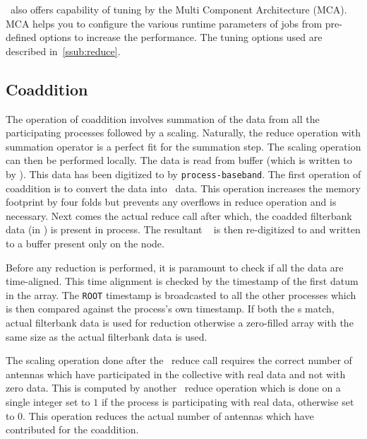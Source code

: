 \par \mpi~also offers capability of tuning by the Multi Component Architecture (MCA). MCA helps you to configure the various runtime parameters of \mpi jobs from pre-defined options to increase the performance. The tuning options used are described in~\autoref{ssub:reduce}.

\subsection {Coaddition}
\label{ssub:coadd}

\par The operation of coaddition involves summation of the data from all the participating processes followed by a scaling. Naturally, the reduce operation with summation operator is a perfect fit for the summation step. 
The scaling operation can then be performed locally. 
The data is read from \dada buffer (which is written to by \pb). This data has been digitized to \nbit{} by \texttt{process-baseband}. 
The first operation of coaddition is to convert the \nbit{} data into \float~data. 
This operation increases the memory footprint by four folds but prevents any overflows in reduce operation and is necessary. 
Next comes the actual \mpi reduce call after which, the coadded filterbank data (in \float) is present in \root process.
The resultant \float~ is then re-digitized to \nbit{} and written to a \dada buffer present only on the \root node.

\par Before any reduction is performed, it is paramount to check if all the data are time-aligned. 
This time alignment is checked by the \mjd timestamp of the first datum in the array. 
The \texttt{ROOT} timestamp is broadcasted to all the other processes which is then compared against the process's own \mjd timestamp. 
If both the \mjd s match, actual filterbank data is used for reduction otherwise a zero-filled array with the same size as the actual filterbank data is used.

\par The scaling operation done after the \mpi~reduce call requires the correct number of antennas which have participated in the collective with real data and not with zero data. 
This is computed by another \mpi~reduce operation which is done on a single integer set to $1$ if the process is participating with real data, otherwise set to $0$. This operation reduces the actual number of antennas which have contributed for the coaddition.

